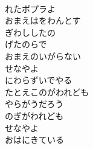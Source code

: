 \documentclass[10pt,b5j]{tarticle} %
\begin{document}
\vspace{1.5em} %
\newcommand{\linespace}{0.5em} %
\newcommand{\blocksize}{0.33\hsize} %
\newcommand{\itemmargin}{3em} %
\begin{enumerate} %
    \setlength{\itemindent}{\itemmargin} %
    \begin{minipage}[c]{\blocksize}
    
        \vspace{\linespace}
        \item~\\
        れたポプラよ\\
        おまえはをわんとす\\
        ぎわししたの\\
        げたのらで\\
        おまえのいがらない\\
        せなやよ\\
        にわらずいでやる\\
        たとえこのがわれども\\
        やらがうだろう\\
        のぎがわれども\\
        せなやよ\\
        おはにきている
        
    \end{minipage}
    \begin{minipage}[c]{\blocksize}
        

\end{minipage}
\end{enumerate}
\end{document}
